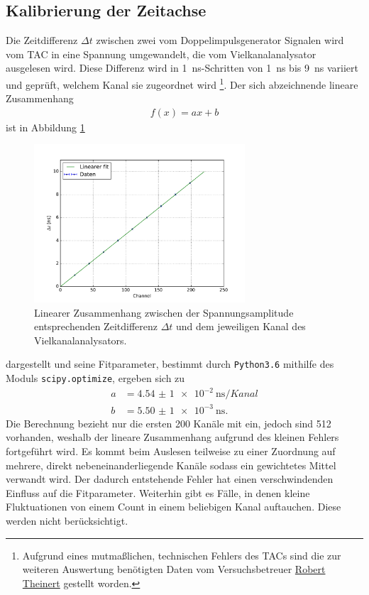 \subsection{Kalibrierung der Zeitachse}
Die Zeitdifferenz $\Delta t$ zwischen zwei vom Doppelimpulsgenerator Signalen wird vom TAC in eine Spannung umgewandelt, die vom Vielkanalanalysator 
ausgelesen wird. Diese Differenz wird in \SI{1}{\nano\second}-Schritten von \SI{1}{\nano\second} bis \SI{9}{\nano\second} variiert und geprüft,
welchem Kanal sie zugeordnet wird \footnote[1]{Aufgrund eines mutmaßlichen, technischen Fehlers des TACs sind die zur weiteren Auswertung benötigten
Daten vom Versuchsbetreuer \href{robert.theinert@tu-dortmund.de}{Robert Theinert} gestellt worden.}. Der sich abzeichnende lineare Zusammenhang
\begin{align}
 f(x) = ax + b
\end{align}
ist in Abbildung \ref{pic:linfit} 
\begin{figure}[t]
 \includegraphics[width=0.7\textwidth]{../pics/linFit}
 \caption{Linearer Zusammenhang zwischen der Spannungsamplitude entsprechenden Zeitdifferenz $\Delta t$ und dem jeweiligen Kanal des 
 Vielkanalanalysators.}
 \label{pic:linfit}
\end{figure}
dargestellt und seine Fitparameter, bestimmt durch \texttt{Python3.6} mithilfe des Moduls \texttt{scipy.optimize}, ergeben sich zu
\begin{align}
 a&= \SI{4,54(1)e-2}{\nano\second\per Kanal}\\
 b&= \SI{5,50(1)e-3}{\nano\second}.
 \label{eq:kalibparams}
\end{align}
Die Berechnung bezieht nur die ersten 200 Kanäle mit ein, jedoch sind 512 vorhanden, weshalb der lineare Zusammenhang aufgrund des kleinen Fehlers
fortgeführt wird.
Es kommt beim Auslesen teilweise zu einer Zuordnung auf mehrere, direkt nebeneinanderliegende Kanäle sodass ein gewichtetes Mittel verwandt wird.
Der dadurch entstehende Fehler hat einen verschwindenden Einfluss auf die Fitparameter. Weiterhin gibt es Fälle, in denen kleine Fluktuationen
von einem Count in einem beliebigen Kanal auftauchen. Diese werden nicht berücksichtigt.
